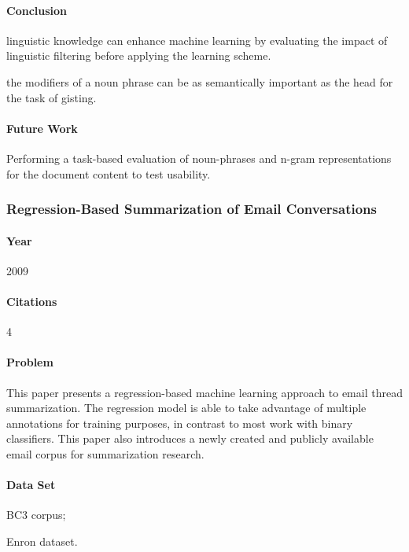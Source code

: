 \paragraph{Conclusion}
\begin{my_itemize}
\item linguistic knowledge can enhance machine learning by evaluating the impact of linguistic filtering before applying the learning scheme.
\item the modifiers of a noun phrase can be as semantically important as the head for the task of gisting.

\end{my_itemize}

\paragraph{Future Work}
Performing a task-based evaluation of noun-phrases and n-gram representations for the document content to test usability.



\subsubsection{Regression-Based Summarization of Email Conversations
 \cite{JAN09}}

\paragraph{Year} 2009
\paragraph{Citations} 4

\paragraph{Problem} 
This paper presents a regression-based machine learning approach to email thread summarization. The regression model is able to take advantage of multiple annotations for training purposes, in contrast to most work with binary classifiers. This paper also introduces a newly created and publicly available email corpus for summarization research.

\paragraph{Data Set}
\begin{my_itemize}
\item BC3 corpus;
\item Enron dataset.
\end{my_itemize}

